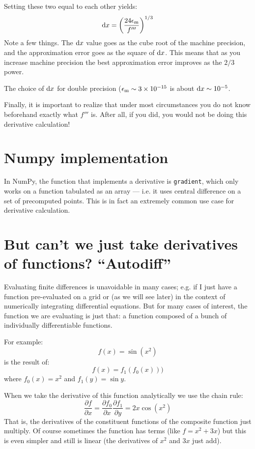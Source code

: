 Setting these two equal to each other yields:
\begin{equation}
{\rm d}x = \left(\frac{24 \epsilon_{\rm m}}{f'''}\right)^{1/3}
\end{equation}
Note a few things. The ${\rm d}x$ value goes as the cube root of the
machine precision, and the approximation error goes as the square of
${\rm d}x$. This means that as you increase machine precision the best
approximation error improves as the $2/3$ power.

The choice of ${\rm d}x$ for double precision ($\epsilon_{\rm m} \sim
3\times 10^{-15}$ is about ${\rm d}x \sim 10^{-5}$.

Finally, it is important to realize that under most circumstances you
do not know beforehand exactly what $f'''$ is. After all, if you did,
you would not be doing this derivative calculation!

\section{Numpy implementation}

In NumPy, the function that implements a derivative is {\tt gradient},
which only works on a function tabulated as an array --- i.e. it uses
central difference on a set of precomputed points. This is in fact an
extremely common use case for derivative calculation.

\section{But can't we just take derivatives of functions? ``Autodiff''}

Evaluating finite differences is unavoidable in many cases; e.g. if I
just have a function pre-evaluated on a grid or (as we will see later)
in the context of numerically integrating differential equations. But
for many cases of interest, the function we are evaluating is just
that: a function composed of a bunch of individually differentiable
functions.

For example:
\begin{equation}
 f(x) = \sin(x^2)
\end{equation}
is the result of:
\begin{equation}
 f(x) = f_1(f_0(x)))
\end{equation}
where $f_0(x) = x^2$ and $f_1(y) = \sin y$.

When we take the derivative of this function analytically we use the
chain rule:
\begin{equation}
 \frac{\partial f}{\partial x} = \frac{\partial f_0}{\partial x} \frac{\partial f_1}{\partial
 y} = 2x \cos(x^2)
\end{equation}
That is, the derivatives of the constituent functions of the composite
function just multiply. Of course sometimes the function has terms
(like $f=x^2 + 3x$) but this is even simpler and still is linear (the
derivatives of $x^2$ and $3x$ just add).

